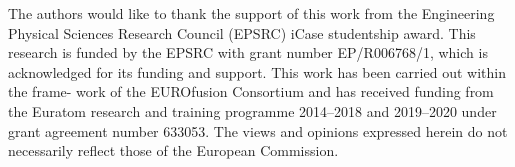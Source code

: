 \documentclass{juliacon}
\begin{document}
The authors would like to thank the support of this work from the Engineering Physical Sciences Research Council (EPSRC) iCase studentship award. This research is funded by the EPSRC with grant number EP/R006768/1, which is acknowledged for its funding and support. This work has been carried out within the frame- work of the EUROfusion Consortium and has received funding from the Euratom research and training programme 2014–2018 and 2019–2020 under grant agreement number 633053. The views and opinions expressed herein do not necessarily reflect those of the European Commission.


\end{document}
